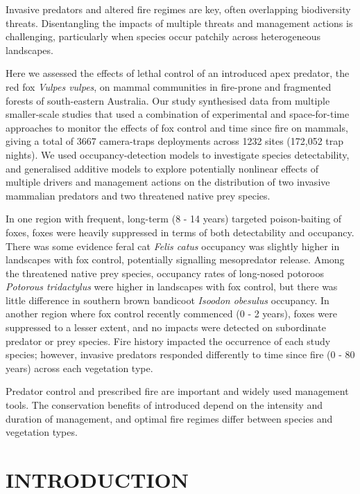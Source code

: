 \documentclass[]{elsarticle} %
\begin{document}
Invasive predators and altered fire regimes are key, often overlapping biodiversity threats. Disentangling the impacts of multiple threats and management actions is challenging, particularly when species occur patchily across heterogeneous landscapes.

Here we assessed the effects of lethal control of an introduced apex predator, the red fox \emph{Vulpes vulpes}, on mammal communities in fire-prone and fragmented forests of south-eastern Australia. Our study synthesised data from multiple smaller-scale studies that used a combination of experimental and space-for-time approaches to monitor the effects of fox control and time since fire on mammals, giving a total of 3667 camera-traps deployments across 1232 sites (172,052 trap nights). We used occupancy-detection models to investigate species detectability, and generalised additive models to explore potentially nonlinear effects of multiple drivers and management actions on the distribution of two invasive mammalian predators and two threatened native prey species.

In one region with frequent, long-term (8 - 14 years) targeted poison-baiting of foxes, foxes were heavily suppressed in terms of both detectability and occupancy. There was some evidence feral cat \emph{Felis catus} occupancy was slightly higher in landscapes with fox control, potentially signalling mesopredator release. Among the threatened native prey species, occupancy rates of long-nosed potoroos \emph{Potorous tridactylus} were higher in landscapes with fox control, but there was little difference in southern brown bandicoot \emph{Isoodon obesulus} occupancy. In another region where fox control recently commenced (0 - 2 years), foxes were suppressed to a lesser extent, and no impacts were detected on subordinate predator or prey species. Fire history impacted the occurrence of each study species; however, invasive predators responded differently to time since fire (0 - 80 years) across each vegetation type.

Predator control and prescribed fire are important and widely used management tools. The conservation benefits of introduced depend on the intensity and duration of management, and optimal fire regimes differ between species and vegetation types.

\newpage

\hypertarget{introduction}{%
\section{INTRODUCTION}\label{introduction}}
\end{document}
